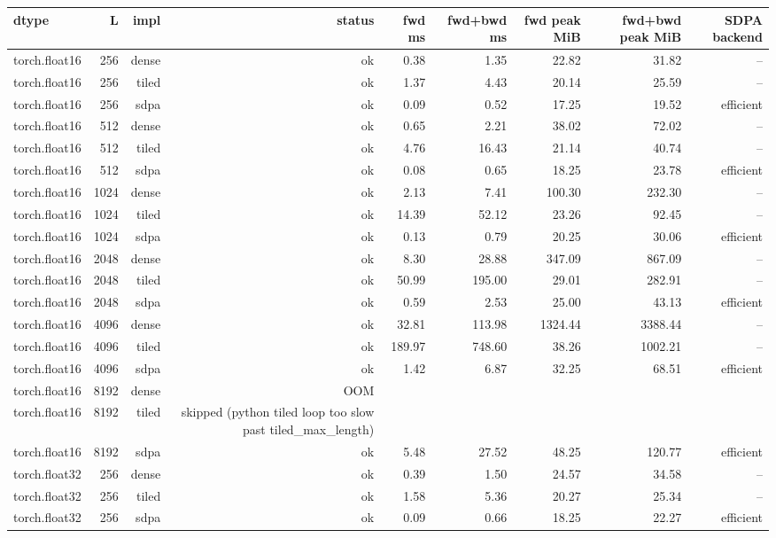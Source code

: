 \begin{tabular}{lrrrrrrrr}
\toprule
dtype & L & impl & status & fwd ms & fwd+bwd ms & fwd peak MiB & fwd+bwd peak MiB & SDPA backend \\
\midrule
torch.float16 & 256 & dense & ok & 0.38 & 1.35 & 22.82 & 31.82 & -- \\
torch.float16 & 256 & tiled & ok & 1.37 & 4.43 & 20.14 & 25.59 & -- \\
torch.float16 & 256 & sdpa & ok & 0.09 & 0.52 & 17.25 & 19.52 & efficient \\
torch.float16 & 512 & dense & ok & 0.65 & 2.21 & 38.02 & 72.02 & -- \\
torch.float16 & 512 & tiled & ok & 4.76 & 16.43 & 21.14 & 40.74 & -- \\
torch.float16 & 512 & sdpa & ok & 0.08 & 0.65 & 18.25 & 23.78 & efficient \\
torch.float16 & 1024 & dense & ok & 2.13 & 7.41 & 100.30 & 232.30 & -- \\
torch.float16 & 1024 & tiled & ok & 14.39 & 52.12 & 23.26 & 92.45 & -- \\
torch.float16 & 1024 & sdpa & ok & 0.13 & 0.79 & 20.25 & 30.06 & efficient \\
torch.float16 & 2048 & dense & ok & 8.30 & 28.88 & 347.09 & 867.09 & -- \\
torch.float16 & 2048 & tiled & ok & 50.99 & 195.00 & 29.01 & 282.91 & -- \\
torch.float16 & 2048 & sdpa & ok & 0.59 & 2.53 & 25.00 & 43.13 & efficient \\
torch.float16 & 4096 & dense & ok & 32.81 & 113.98 & 1324.44 & 3388.44 & -- \\
torch.float16 & 4096 & tiled & ok & 189.97 & 748.60 & 38.26 & 1002.21 & -- \\
torch.float16 & 4096 & sdpa & ok & 1.42 & 6.87 & 32.25 & 68.51 & efficient \\
torch.float16 & 8192 & dense & OOM &  &  &  &  &  \\
torch.float16 & 8192 & tiled & skipped (python tiled loop too slow past tiled\_max\_length) &  &  &  &  &  \\
torch.float16 & 8192 & sdpa & ok & 5.48 & 27.52 & 48.25 & 120.77 & efficient \\
torch.float32 & 256 & dense & ok & 0.39 & 1.50 & 24.57 & 34.58 & -- \\
torch.float32 & 256 & tiled & ok & 1.58 & 5.36 & 20.27 & 25.34 & -- \\
torch.float32 & 256 & sdpa & ok & 0.09 & 0.66 & 18.25 & 22.27 & efficient \\

\end{tabular}
